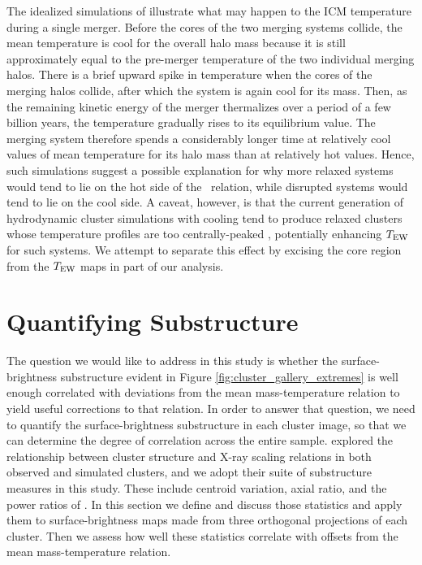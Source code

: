 \documentclass{aastex} \usepackage{natbib}
\begin{document}
The idealized simulations of \cite{2007MNRAS.380..437P} illustrate
what may happen to the ICM temperature during a single merger.  Before
the cores of the two merging systems collide, the mean temperature is
cool for the overall halo mass because it is still approximately equal
to the pre-merger temperature of the two individual merging halos.
There is a brief upward spike in temperature when the cores of the
merging halos collide, after which the system is again cool for its
mass.  Then, as the remaining kinetic energy of the merger thermalizes
over a period of a few billion years, the temperature gradually rises
to its equilibrium value.  The merging system therefore spends a
considerably longer time at relatively cool values of mean temperature
for its halo mass than at relatively hot values.  Hence, such
simulations suggest a possible explanation for why more relaxed
systems would tend to lie on the hot side of the \mtx\ relation, while
disrupted systems would tend to lie on the cool side.  A caveat,
however, is that the current generation of hydrodynamic cluster
simulations with cooling tend to produce relaxed clusters whose
temperature profiles are too centrally-peaked
\citep{2003MNRAS.342.1025T, 2007ApJ...668....1N}, potentially
enhancing $T_{\rm EW}$ for such systems.  We attempt to separate this effect
by excising the core region from the $T_{\rm EW}$ maps in part of our
analysis.

\section{Quantifying Substructure}

The question we would like to address in this study is whether the
surface-brightness substructure evident in Figure
\ref{fig:cluster_gallery_extremes} is well enough correlated with
deviations from the mean mass-temperature relation to yield useful
corrections to that relation.  In order to answer that question, we
need to quantify the surface-brightness substructure in each cluster
image, so that we can determine the degree of correlation across the
entire sample.  \cite{2006ApJ...639...64O} explored the relationship
between cluster structure and X-ray scaling relations in both observed
and simulated clusters, and we adopt their suite of substructure
measures in this study.  These include centroid variation, axial
ratio, and the power ratios of \cite{1995ApJ...452..522B}.  In this
section we define and discuss those statistics and apply them to
surface-brightness maps made from three orthogonal projections of each
cluster.  Then we assess how well these statistics correlate with
offsets from the mean mass-temperature relation.
\end{document}

